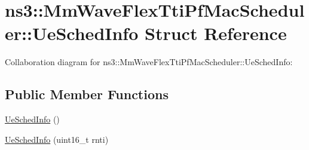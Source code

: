 \hypertarget{structns3_1_1MmWaveFlexTtiPfMacScheduler_1_1UeSchedInfo}{}\section{ns3\+:\+:Mm\+Wave\+Flex\+Tti\+Pf\+Mac\+Scheduler\+:\+:Ue\+Sched\+Info Struct Reference}
\label{structns3_1_1MmWaveFlexTtiPfMacScheduler_1_1UeSchedInfo}


Collaboration diagram for ns3\+:\+:Mm\+Wave\+Flex\+Tti\+Pf\+Mac\+Scheduler\+:\+:Ue\+Sched\+Info\+:
\subsection*{Public Member Functions}
\begin{DoxyCompactItemize}
\item 
\hyperlink{structns3_1_1MmWaveFlexTtiPfMacScheduler_1_1UeSchedInfo_a8ab0f7f659e7680df808ee9e7e5a3414}{Ue\+Sched\+Info} ()
\item 
\hyperlink{structns3_1_1MmWaveFlexTtiPfMacScheduler_1_1UeSchedInfo_afe48d9e5f0e3c6d9c216638c29409226}{Ue\+Sched\+Info} (uint16\+\_\+t rnti)
\end{DoxyCompactItemize}
